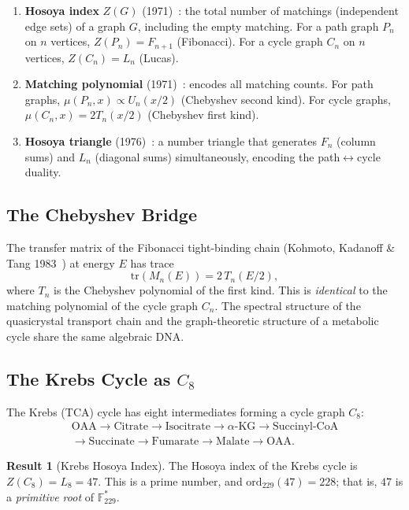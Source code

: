 \documentclass[12pt]{article}
\theoremstyle{principia}
\theoremstyle{definition}
\newtheorem{result}[theorem]{Result}
\theoremstyle{remark}
\providecommand{\FF}{\mathbb{F}}
\begin{document}
\begin{enumerate}[noitemsep]
    \item \textbf{Hosoya index} $Z(G)$ (1971)~\cite{Hosoya71}: the total number of matchings (independent edge sets) of a graph $G$, including the empty matching. For a path graph $P_n$ on $n$ vertices, $Z(P_n) = F_{n+1}$ (Fibonacci). For a cycle graph $C_n$ on $n$ vertices, $Z(C_n) = L_n$ (Lucas).
    \item \textbf{Matching polynomial} (1971)~\cite{Hosoya71}: encodes all matching counts. For path graphs, $\mu(P_n, x) \propto U_n(x/2)$ (Chebyshev second kind). For cycle graphs, $\mu(C_n, x) = 2 T_n(x/2)$ (Chebyshev first kind).
    \item \textbf{Hosoya triangle} (1976)~\cite{Hosoya76}: a number triangle that generates $F_n$ (column sums) and $L_n$ (diagonal sums) simultaneously, encoding the path$\leftrightarrow$cycle duality.
\end{enumerate}

\subsection{The Chebyshev Bridge}

The transfer matrix of the Fibonacci tight-binding chain (Kohmoto, Kadanoff \& Tang 1983~\cite{KKT83}) at energy $E$ has trace
\begin{equation}\label{eq:transfer}
    \mathrm{tr}(M_n(E)) = 2\,T_n(E/2),
\end{equation}
where $T_n$ is the Chebyshev polynomial of the first kind. This is \emph{identical} to the matching polynomial of the cycle graph $C_n$. The spectral structure of the quasicrystal transport chain and the graph-theoretic structure of a metabolic cycle share the same algebraic DNA.

\subsection{The Krebs Cycle as $C_8$}

The Krebs (TCA) cycle has eight intermediates forming a cycle graph $C_8$:
\begin{gather*}
\text{OAA} \to \text{Citrate} \to \text{Isocitrate} \to \alpha\text{-KG} \to \text{Succinyl-CoA} \\
\to \text{Succinate} \to \text{Fumarate} \to \text{Malate} \to \text{OAA}.
\end{gather*}

\begin{result}[Krebs Hosoya Index]\label{res:krebs_hosoya}
The Hosoya index of the Krebs cycle is $Z(C_8) = L_8 = 47$. This is a prime number, and $\mathrm{ord}_{229}(47) = 228$; that is, $47$ is a \emph{primitive root} of\/ $\FF_{229}^*$.
\end{result}
\end{document}

